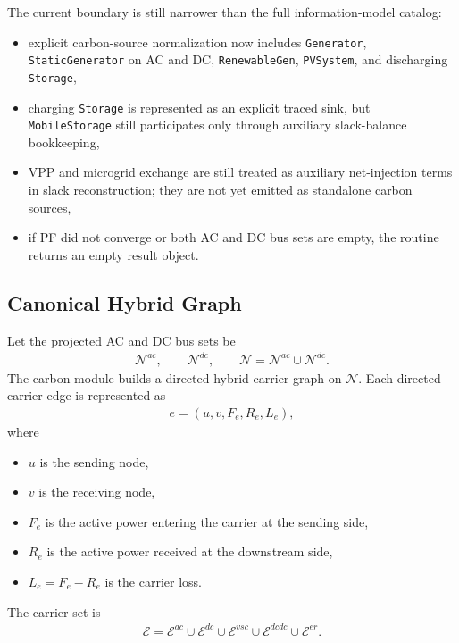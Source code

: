 The current boundary is still narrower than the full information-model catalog:
\begin{itemize}
  \item explicit carbon-source normalization now includes \texttt{Generator}, \texttt{StaticGenerator} on AC and DC, \texttt{RenewableGen}, \texttt{PVSystem}, and discharging \texttt{Storage},
  \item charging \texttt{Storage} is represented as an explicit traced sink, but \texttt{MobileStorage} still participates only through auxiliary slack-balance bookkeeping,
  \item VPP and microgrid exchange are still treated as auxiliary net-injection terms in slack reconstruction; they are not yet emitted as standalone carbon sources,
  \item if PF did not converge or both AC and DC bus sets are empty, the routine returns an empty result object.
\end{itemize}

\subsection{Canonical Hybrid Graph}

Let the projected AC and DC bus sets be
\begin{align}
\mathcal{N}^{ac},\qquad \mathcal{N}^{dc},\qquad
\mathcal{N} = \mathcal{N}^{ac} \cup \mathcal{N}^{dc}.
\end{align}
The carbon module builds a directed hybrid carrier graph on \(\mathcal{N}\).
Each directed carrier edge is represented as
\begin{align}
e = \left(u,v,F_e,R_e,L_e\right),
\end{align}
where
\begin{itemize}
  \item \(u\) is the sending node,
  \item \(v\) is the receiving node,
  \item \(F_e\) is the active power entering the carrier at the sending side,
  \item \(R_e\) is the active power received at the downstream side,
  \item \(L_e = F_e - R_e\) is the carrier loss.
\end{itemize}
The carrier set is
\begin{align}
\mathcal{E} = \mathcal{E}^{ac} \cup \mathcal{E}^{dc} \cup \mathcal{E}^{vsc} \cup \mathcal{E}^{dcdc} \cup \mathcal{E}^{er}.
\end{align}

